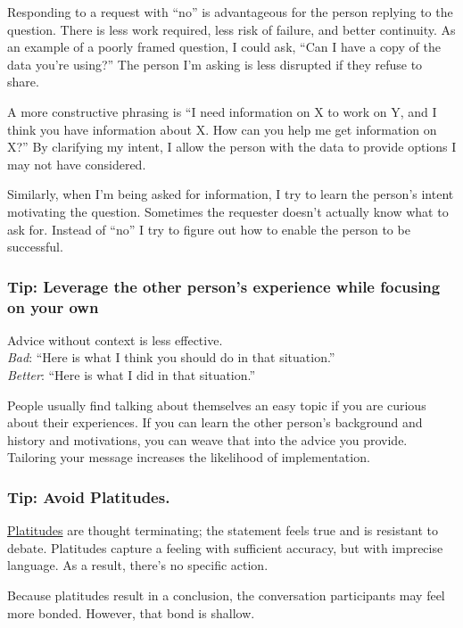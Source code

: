 Responding to a request with ``no'' is advantageous for the person replying to the question. There is less work required, less risk of failure, and better continuity. As an example of a poorly framed question, I could ask, ``Can I have a copy of the data you're using?'' The person I'm asking is less disrupted if they refuse to share. 

A more constructive phrasing is ``I need information on X to work on Y, and I think you have information about X. How can you help me get information on X?'' By clarifying my intent, I allow the person with the data to provide options I may not have considered.

Similarly, when I'm being asked for information, I try to learn the person's intent motivating the question. Sometimes the requester doesn't actually know what to ask for. Instead of ``no'' I try to figure out how to enable the person to be successful. 

\subsubsection{Tip: Leverage the other person's experience while focusing on your own\label{sec:advice}}

Advice without context is less effective.\\
\textit{Bad}: ``Here is what I think you should do in that situation.''\\
\textit{Better}: ``Here is what I did in that situation.''

People usually find talking about themselves an easy topic if you are curious about their experiences. 
If you can learn the other person's background and history and motivations, you can weave that into the advice you provide. 
Tailoring your message increases the likelihood of implementation. 

\subsubsection{Tip: Avoid Platitudes\label{sec:platitudes}.}
\href{https://en.wikipedia.org/wiki/Platitude}{Platitudes} are \gls{thought terminating}; the statement feels true and is resistant to debate. Platitudes capture a feeling with sufficient accuracy, but with imprecise language. As a result, there's no specific action.

Because platitudes result in a conclusion, the conversation participants may feel more bonded. However, that bond is shallow.

